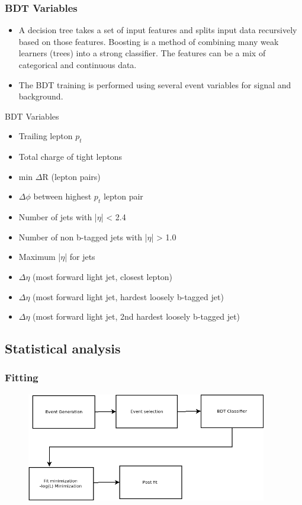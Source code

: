 \documentclass[11pt]{beamer}
\begin{document}
\begin{frame}
\frametitle{BDT Variables}
\small{
\begin{itemize}
\item A decision tree takes a set of input features and splits input data recursively based on
those features.
Boosting is a method of combining many weak learners (trees) into a strong classifier. The features can be a mix of categorical and continuous data.
\item The BDT training is performed using several event variables for signal and background. 
\end{itemize}
BDT Variables}
\tiny{
\begin{itemize}
\item	Trailing lepton $p_{t}$
\item 	Total charge of tight leptons
\item 	min $\Delta$R (lepton pairs)
\item 	$\Delta\phi$ between highest $p_t$ lepton pair
\item 	Number of jets with |$\eta$| < 2.4
\item	Number of non b-tagged jets with |$\eta$| > 1.0
\item	Maximum |$\eta$| for jets
\item	$\Delta\eta$ (most forward light jet, closest lepton)
\item	$\Delta\eta$ (most forward light jet, hardest loosely b-tagged jet)
\item	$\Delta\eta$ (most forward light jet, 2nd hardest loosely b-tagged jet)
\end{itemize} }
\end{frame}



\begin{frame}
\section{Statistical analysis}
\frametitle{Fitting}
	\begin{center}
	\begin{figure}
		\includegraphics[width=10.5cm]{figures/fit-box.png}
		\caption*{}
	\end{figure}
\end{center}
\end{frame}
\end{document}
